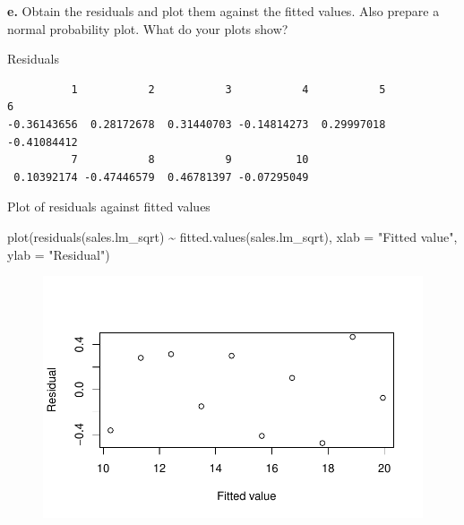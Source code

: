 \documentclass[
  letterpaper,
  DIV=11,
  numbers=noendperiod]{scrartcl}
\newenvironment{Shaded}{\begin{snugshade}}{\end{snugshade}}
\newcommand{\AttributeTok}[1]{\textcolor[rgb]{0.40,0.45,0.13}{#1}}
\newcommand{\FunctionTok}[1]{\textcolor[rgb]{0.28,0.35,0.67}{#1}}
\newcommand{\NormalTok}[1]{\textcolor[rgb]{0.00,0.23,0.31}{#1}}
\newcommand{\SpecialCharTok}[1]{\textcolor[rgb]{0.37,0.37,0.37}{#1}}
\newcommand{\StringTok}[1]{\textcolor[rgb]{0.13,0.47,0.30}{#1}}
\begin{document}
\textbf{e.} Obtain the residuals and plot them against the fitted
values. Also prepare a normal probability plot. What do your plots show?

Residuals

\begin{Shaded}
\end{Shaded}

\begin{verbatim}
          1           2           3           4           5           6 
-0.36143656  0.28172678  0.31440703 -0.14814273  0.29997018 -0.41084412 
          7           8           9          10 
 0.10392174 -0.47446579  0.46781397 -0.07295049 
\end{verbatim}

Plot of residuals against fitted values

\begin{Shaded}
\begin{Highlighting}[]
\FunctionTok{plot}\NormalTok{(}\FunctionTok{residuals}\NormalTok{(sales.lm\_sqrt) }\SpecialCharTok{\textasciitilde{}} \FunctionTok{fitted.values}\NormalTok{(sales.lm\_sqrt),}
     \AttributeTok{xlab =} \StringTok{"Fitted value"}\NormalTok{, }\AttributeTok{ylab =} \StringTok{"Residual"}\NormalTok{)}
\end{Highlighting}
\end{Shaded}

\begin{figure}[H]

{\centering \includegraphics{sta9700_ch3_hw_files/figure-pdf/unnamed-chunk-34-1.pdf}

}

\end{figure}
\end{document}

